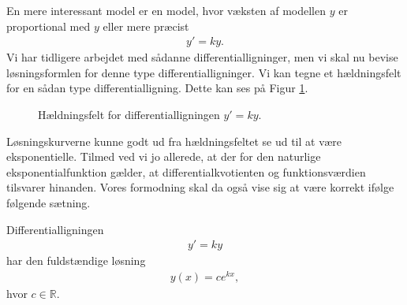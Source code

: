 En mere interessant model er en model, hvor væksten af modellen $y$ er proportional med $y$ eller mere præcist
\begin{align*}
	y' = ky.
\end{align*}
Vi har tidligere arbejdet med sådanne differentialligninger, men vi skal nu bevise løsningsformlen for denne type differentialligninger. 
Vi kan tegne et hældningsfelt for en sådan type differentialligning. Dette kan ses på Figur \ref{fig:eksphæld}.
\begin{figure}[H]
	\centering
	\caption{Hældningsfelt for differentialligningen $y' = ky$.}
	\label{fig:eksphæld}
\end{figure}
Løsningskurverne kunne godt ud fra hældningsfeltet se ud til at være eksponentielle. Tilmed ved vi jo allerede, at der for den naturlige eksponentialfunktion gælder, at differentialkvotienten og funktionsværdien tilsvarer hinanden. Vores formodning skal da også vise sig at være korrekt ifølge følgende sætning. 
\begin{setn}\label{setn:2}
	Differentialligningen 
	\begin{align*}
		y' = ky
	\end{align*}
	har den fuldstændige løsning
	\begin{align*}
		y(x) = ce^{kx},
	\end{align*}
	hvor $c \in \mathbb{R}$. 
\end{setn}
